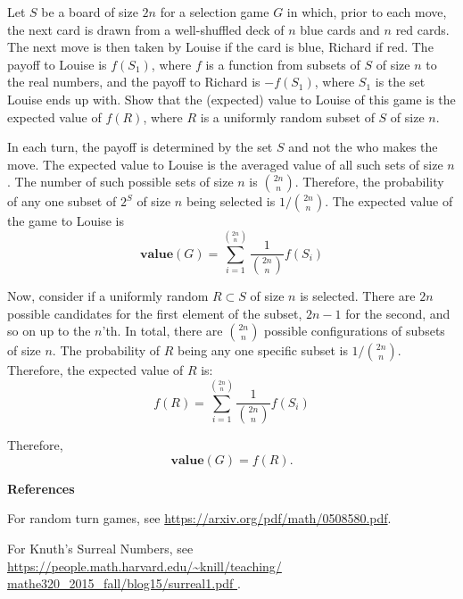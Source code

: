 \documentclass[11pt, reqno]{amsart}
\begin{document}
\newpage
  \begin{problem}[22]
    Let $S$ be a board of size $2n$ for a selection game $G$ in which,
    prior to each move, the next card is drawn from a well-shuffled deck
    of $n$ blue cards and $n$ red cards.
    The next move is then taken by Louise if the card is blue, Richard if red.
    The payoff to Louise is $f(S_1)$, where $f$ is a function from subsets of $S$
    of size $n$ to the real numbers, and the payoff to Richard is $-f(S_1)$,
    where $S_1$ is the set Louise ends up with.
    Show that the (expected) value to Louise of this game is the expected value of $f(R)$,
    where $R$ is a uniformly random subset of $S$ of size $n$.

    \step
    In each turn, the payoff is determined by the set $S$ and not the who makes the move.
    The expected value to Louise is the averaged value of all such sets of size $n$.
    The number of such possible sets of size $n$ is $\binom{2n}{n}$.
    Therefore, the probability of any one subset of $2^S$ of size $n$ being selected
    is $1/\binom{2n}{n}$. The expected value of the game to Louise is
    \[ \mathbf{value}(G) = \sum_{i = 1}^{\binom{2n}{n}} \frac{1}{\binom{2n}{n}} f(S_i) \]

    \step
    Now, consider if a uniformly random $R \subset S$ of size $n$ is selected.
    There are $2n$ possible candidates for the first element of the subset,
    $2n-1$ for the second, and so on up to the $n$'th.
    In total, there are $\binom{2n}{n}$ possible configurations of subsets of size $n$.
    The probability of $R$ being any one specific subset is $1/\binom{2n}{n}$.
    Therefore, the expected value of $R$ is:
    \[ f(R) = \sum_{i = 1}^{\binom{2n}{n}} \frac{1}{\binom{2n}{n}} f(S_i) \]

    \step
    Therefore, \[ \mathbf{value}(G) = f(R). \]
    
    \vfill
    \step
    \textbf{References}
    \begin{enumroman}
      \item For random turn games, see \url{https://arxiv.org/pdf/math/0508580.pdf}.
      \item For Knuth's Surreal Numbers, see \\ \url{
        https://people.math.harvard.edu/~knill/teaching/
        mathe320_2015_fall/blog15/surreal1.pdf
      }.
    \end{enumroman}
  \end{problem}
\end{document}

